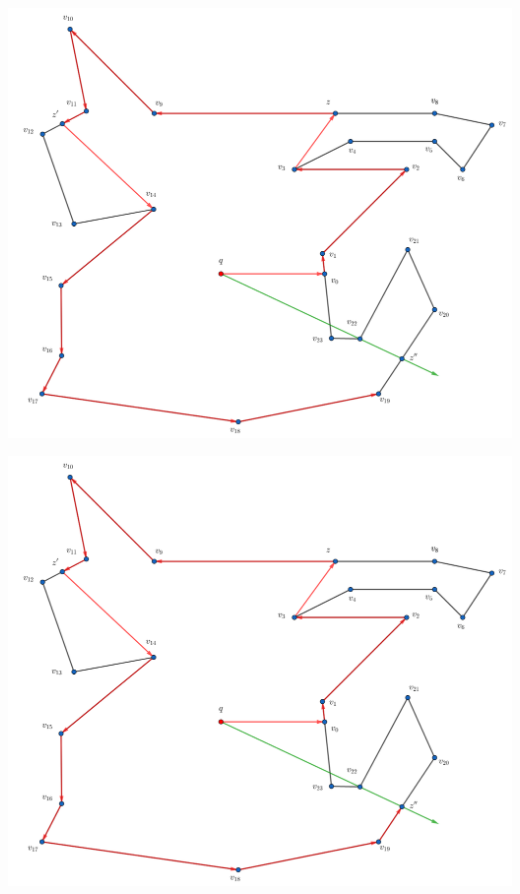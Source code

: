 \begin{frame}
  \centering \includegraphics[width=0.70 \paperwidth]{images/Ejecucion/e30.png}
\end{frame}

\begin{frame}
  \centering \includegraphics[width=0.70 \paperwidth]{images/Ejecucion/e31.png}
\end{frame}

